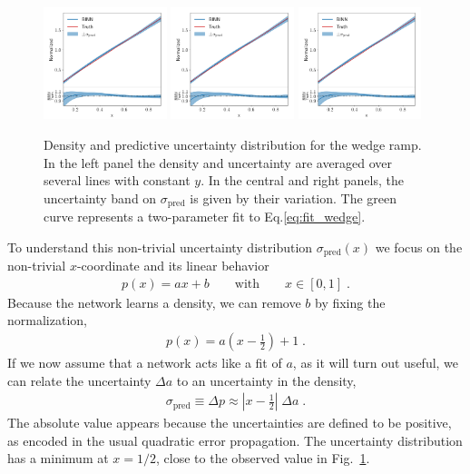 \begin{figure}[t]
\centering
\includegraphics[width=0.32\textwidth, page=1]{./figures/bINN/linear_1dplots}
\includegraphics[width=0.32\textwidth, page=2]{./figures/bINN/linear_1dplots}
\includegraphics[width=0.32\textwidth, page=3]{./figures/bINN/linear_1dplots}
\caption{Density and predictive uncertainty distribution for the wedge
  ramp. In the left panel the density and uncertainty are averaged
  over several lines with constant $y$. In the central and right
  panels, the uncertainty band on $\sigma_\text{pred}$ is given by
  their variation.  The green curve represents a two-parameter fit to
  Eq.\eqref{eq:fit_wedge}.}
  \label{fig:linear_unc}
\end{figure}

To understand this non-trivial uncertainty distribution
$\sigma_\text{pred}(x)$ we focus on the non-trivial $x$-coordinate and
its linear behavior
%
\begin{align}
  p(x) = a  x + b
  \qquad \text{with} \qquad x \in [0,1] \; .
\end{align}
%
Because the network learns a density, we can remove $b$ by
fixing the normalization,
%
\begin{align}
  p(x) = a \left( x - \frac{1}{2} \right) + 1 \; .
\end{align}
%
If we now assume that a network acts like a fit of $a$, as it will turn
out useful, we can relate the uncertainty $\Delta a$ to an uncertainty
in the density,
%
\begin{align}
\sigma_\text{pred} \equiv \Delta p \approx \left| x - \frac{1}{2} \right| \; \Delta a \; .
\label{eq:simple_wedge}
\end{align}
%
The absolute value appears because the uncertainties are defined to be
positive, as encoded in the usual quadratic error propagation. The
uncertainty distribution has a minimum at $x=1/2$, close to the
observed value in Fig.~\ref{fig:linear_unc}.

